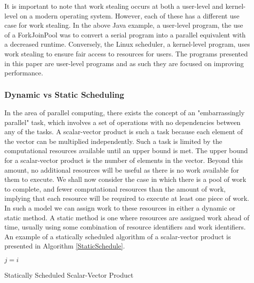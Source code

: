 \documentclass[12pt]{article}
\begin{document}
It is important to note that work stealing occurs at both a user-level and kernel-level on a modern operating system. However, each of these has a different use case for work stealing. In the above Java example, a user-level program, the use of a ForkJoinPool was to convert a serial program into a parallel equivalent with a decreased runtime. Conversely, the Linux scheduler, a kernel-level program, uses work stealing to ensure fair access to resources for users. The programs presented in this paper are user-level programs and as such they are focused on improving performance.

\subsubsection{Dynamic vs Static Scheduling}
In the area of parallel computing, there exists the concept of an "embarrassingly parallel" task, which involves a set of operations with no dependencies between any of the tasks. A scalar-vector product is such a task because each element of the vector can be multiplied independently. Such a task is limited by the computational resources available until an upper bound is met. The upper bound for a scalar-vector product is the number of elements in the vector. Beyond this amount, no additional resources will be useful as there is no work available for them to execute.
\newline
We shall now consider the case in which there is a pool of work to complete, and fewer computational resources than the amount of work, implying that each resource will be required to execute at least one piece of work. In such a model we can assign work to these resources in either a dynamic or static method.
\newline
A static method is one where resources are assigned work ahead of time, usually using some combination of resource identifiers and work identifiers. An example of a statically scheduled algorithm of a scalar-vector product is presented in Algorithm \ref{StaticSchedule}.

\IncMargin{1em}
\begin{algorithm}[H]
 \BlankLine
 
 $j = i$\;
 \caption{Statically Scheduled Scalar-Vector Product}
 \label{StaticSchedule}
\end{algorithm}
\DecMargin{1em}
\medskip
\end{document}
